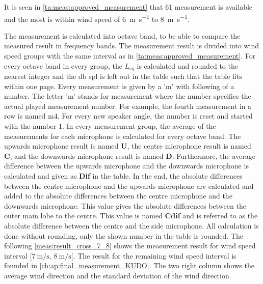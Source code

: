 It is seen in \autoref{ta:meas:approved_measurement} that 61 measurement is available and the most is within wind speed of \SI{6}{\meter\per\second} to \SI{8}{\meter\per\second}.

The measurement is calculated into octave band, to be able to compare the measured result in frequency bands. The measurement result is divided into wind speed groups with the same interval as in \autoref{ta:meas:approved_measurement}. For every octave band in every group, the $L_{eq}$ is calculated and rounded to the nearest integer and the \si{\decibel} \gls{spl} is left out in the table such that the table fits within one page. Every measurement is given by a 'm' with following of a number. The letter 'm' stands for measurement where the number specifies the actual played measurement number. For example, the fourth measurement in a row is named m4. For every new speaker angle, the number is reset and started with the number 1. In every measurement group, the average of the measurements for each microphone is calculated for every octave band. The upwards microphone result is named \textbf{U}, the centre microphone result is named \textbf{C}, and the downwards microphone result is named \textbf{D}. Furthermore, the average difference between the upwards microphone and the downwards microphone is calculated and given as \textbf{Dif} in the table. In the end, the absolute differences between the centre microphone and the upwards microphone are calculated and added to the absolute differences between the centre microphone and the downwards microphone. This value gives the absolute differences between the outer main lobe to the centre. This value is named \textbf{Cdif} and is referred to as the absolute difference between the centre and the side microphone. All calculation is done without rounding, only the shown number in the table is rounded. The following \autoref{meas:result_cross_7_8} shows the measurement result for wind speed interval $[\SI{7}{\meter\per\second},\, \SI{8}{\meter\per\second}[ $. The result for the remaining wind speed interval is founded in \autoref{ch:ap:final_measurement_KUDO}. The two right column shows the average wind direction and the standard deviation of the wind direction.






